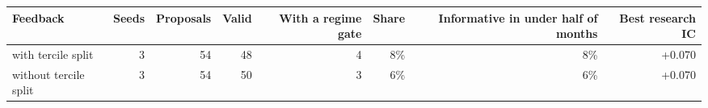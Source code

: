 \begin{tabular}{lrrrrrrr}
\toprule
Feedback & Seeds & Proposals & Valid & With a regime gate & Share & Informative in under half of months & Best research IC \\
\midrule
with tercile split & 3 & 54 & 48 & 4 & 8\% & 8\% & +0.070 \\
without tercile split & 3 & 54 & 50 & 3 & 6\% & 6\% & +0.070 \\
\bottomrule
\end{tabular}
